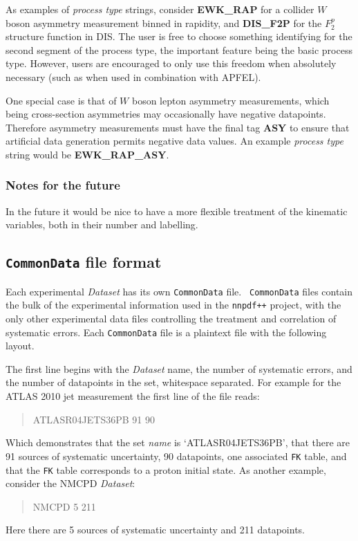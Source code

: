 \documentclass[11pt]{article}
\begin{document}
As examples of \emph{process type} strings, consider \textbf{EWK\_RAP} for a
collider $W$ boson asymmetry measurement binned in rapidity, and
\textbf{DIS\_F2P} for the $F_2^p$ structure function in DIS. The user is free to
choose something identifying for the second segment of the process type, the
important feature being the basic process type. However, users are encouraged to
only use this freedom when absolutely necessary (such as when used in
combination with APFEL).

One special case is that of $W$ boson lepton asymmetry measurements, which being
cross-section asymmetries may occasionally have negative datapoints. Therefore
asymmetry measurements must have the final tag \textbf{ASY} to ensure that
artificial data generation permits negative data values. An example
\emph{process type} string would be \textbf{EWK\_RAP\_ASY}.

\subsubsection*{Notes for the future}
In the future it would be nice to have a more flexible treatment of the
kinematic variables, both in their number and labelling.


\subsection{{\tt CommonData} file format}
Each experimental \emph{Dataset} has its own {\tt CommonData} file. {\tt
CommonData} files contain the bulk of the experimental information used in the
{\tt nnpdf++} project, with the only other experimental data files controlling
the treatment and correlation of systematic errors. Each {\tt CommonData} file
is a plaintext file with the following layout.

The first line begins with the \emph{Dataset} name, the number of systematic
errors, and the number of datapoints in the set, whitespace separated.  For
example for the ATLAS 2010 jet measurement the first line of the file reads:
%
\begin{quotation}\noindent
ATLASR04JETS36PB        91      90
\end{quotation}
%
Which demonstrates that the set \emph{name} is `ATLASR04JETS36PB', that there
are 91 sources of systematic uncertainty, 90 datapoints, one associated {\tt FK}
table, and that the {\tt FK} table corresponds to a proton initial state. As
another example, consider the NMCPD \emph{Dataset}:
%
\begin{quotation}\noindent
NMCPD   5       211
\end{quotation}
%
Here there are 5 sources of systematic uncertainty and 211 datapoints.
\end{document}
